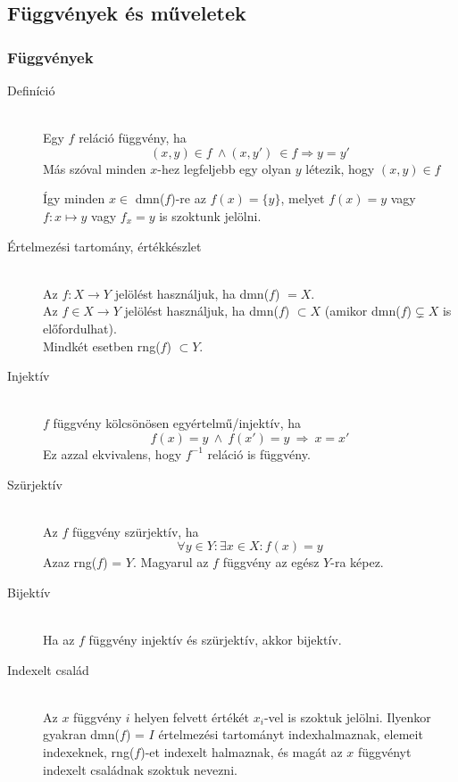 \documentclass[margin=0px]{article}
\begin{document}
\subsection{Függvények és műveletek}
\subsubsection{Függvények}
\begin{description}
    \item[Definíció] \hfill \\
        Egy $f$ reláció függvény, ha
        \[ (x,y) \in f \ \land (x,y') \ \in f \Longrightarrow y = y' \]
        Más szóval minden $x$-hez legfeljebb egy olyan $y$ létezik, hogy $(x,y) \in f$

        Így minden $x \in$ dmn($f$)-re az $f(x) = \{y\}$, melyet $f(x) = y$ vagy $f: x \mapsto y$ vagy $f_x = y$ is szoktunk jelölni.

    \item[Értelmezési tartomány, értékkészlet] \hfill \\
        Az $f : X \rightarrow Y$ jelölést használjuk, ha dmn($f$) $ = X $. \\
        Az $f \in X \rightarrow Y$ jelölést használjuk, ha dmn($f$) $\subset X$ (amikor dmn($f$)$ \subsetneq X$ is előfordulhat).\\
        Mindkét esetben rng($f$) $\subset Y$.

    \item[Injektív] \hfill \\
        $f$ függvény kölcsönösen egyértelmű/injektív, ha
        \[ f(x) = y \ \land \ f(x') = y \ \Longrightarrow \ x = x' \]
        Ez azzal ekvivalens, hogy $f^{-1}$ reláció is függvény.
    \item[Szürjektív] \hfill \\
        Az $f$ függvény szürjektív, ha
        \[ \forall y \in Y : \exists x\in X : f(x) = y\]
        Azaz rng($f$) = $Y$. Magyarul az $f$ függvény az egész $Y$-ra képez.
    \item[Bijektív] \hfill \\
        Ha az $f$ függvény injektív és szürjektív, akkor bijektív.
    \item[Indexelt család] \hfill \\
        Az $x$ függvény $i$ helyen felvett értékét $x_i$-vel is szoktuk jelölni. Ilyenkor gyakran dmn($f$) = $I$ értelmezési tartományt indexhalmaznak, elemeit indexeknek, rng($f$)-et indexelt halmaznak, és magát az $x$ függvényt indexelt családnak szoktuk nevezni.
\end{description}
\end{document}
